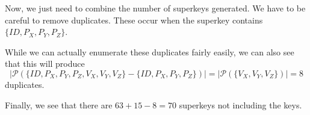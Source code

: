\documentclass[12pt,letterpaper]{article}
\begin{document}
\begin{enumerate}
\begin{enumerate}
          Now, we just need to combine the number of superkeys generated.
          We have to be careful to remove duplicates.
          These occur when the superkey contains $\{ID, P_X, P_Y, P_Z\}$.

          While we can actually enumerate these duplicates fairly easily,
          we can also see that this will produce
          \[|\mathcal{P}\left(\{ID, P_X, P_Y, P_Z, V_X, V_Y, V_Z\} - \{ID, P_X, P_Y, P_Z\}\right)| = |\mathcal{P}\left(\{V_X, V_Y, V_Z\}\right)| = 8\]
          duplicates.

          Finally, we see that there are $63 + 15 - 8 = 70$ superkeys not including the keys.
      \end{enumerate}
  \end{enumerate}
\end{document}
